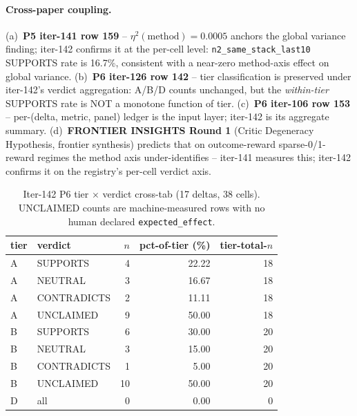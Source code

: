 \documentclass{article}
\begin{document}
\paragraph{Cross-paper coupling.}
(a)~\textbf{P5 iter-141 row 159} -- $\eta^2(\text{method}) = 0.0005$
anchors the global variance finding; iter-142 confirms it at the
per-cell level: \texttt{n2\_same\_stack\_last10} SUPPORTS rate is 16.7\%,
consistent with a near-zero method-axis effect on global variance.
(b)~\textbf{P6 iter-126 row 142} -- tier classification is preserved
under iter-142's verdict aggregation: A/B/D counts unchanged, but the
\emph{within-tier} SUPPORTS rate is NOT a monotone function of tier.
(c)~\textbf{P6 iter-106 row 153} -- per-(delta, metric, panel) ledger is
the input layer; iter-142 is its aggregate summary.  (d)~\textbf{FRONTIER
INSIGHTS Round 1} (Critic Degeneracy Hypothesis, frontier synthesis)
predicts that on outcome-reward sparse-0/1-reward regimes the method
axis under-identifies -- iter-141 measures this; iter-142 confirms it on
the registry's per-cell verdict axis.

\begin{table}[t]
\centering
\small
\caption{Iter-142 P6 tier $\times$ verdict cross-tab (17 deltas, 38 cells).
UNCLAIMED counts are machine-measured rows with no human declared
\texttt{expected\_effect}.}
\label{tab:p6-iter142-tier-x-verdict}
\begin{tabular}{llrrr}
\toprule
tier & verdict & $n$ & pct-of-tier (\%) & tier-total-$n$ \\
\midrule
A & SUPPORTS    & 4 & 22.22 & 18 \\
A & NEUTRAL     & 3 & 16.67 & 18 \\
A & CONTRADICTS & 2 & 11.11 & 18 \\
A & UNCLAIMED   & 9 & 50.00 & 18 \\
\midrule
B & SUPPORTS    & 6 & 30.00 & 20 \\
B & NEUTRAL     & 3 & 15.00 & 20 \\
B & CONTRADICTS & 1 &  5.00 & 20 \\
B & UNCLAIMED   &10 & 50.00 & 20 \\
\midrule
D & all         & 0 &  0.00 &  0 \\
\bottomrule
\end{tabular}
\end{table}
\end{document}
